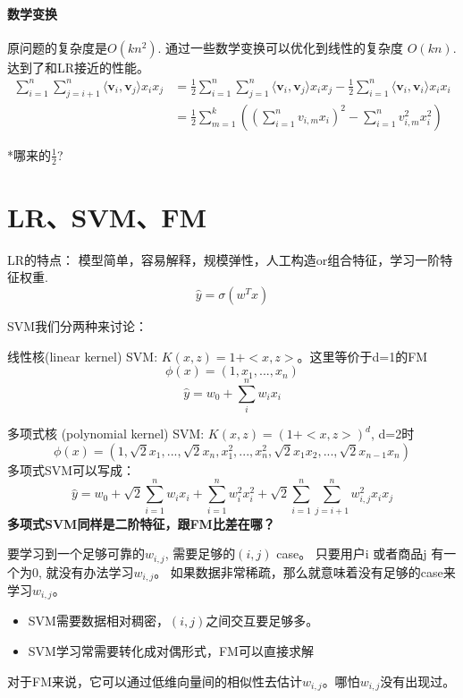 \documentclass{article}
\begin{document}
\begin{CJK*}{UTF8}{gbsn}
\paragraph{数学变换} 原问题的复杂度是$O(kn^{2})$. 通过一些数学变换可以优化到线性的复杂度 $O(kn)$. 达到了和LR接近的性能。
\begin{align*}
\sum_{i=1}^{n}\sum_{j=i+1}^{n}\langle \textbf{v}_{i} ,\textbf{v}_{j} \rangle x_{i}x_{j}
&= \frac{1}{2} \sum_{i=1}^{n}\sum_{j=1}^{n}\langle \textbf{v}_{i} ,\textbf{v}_{j} \rangle x_{i}x_{j} -\frac{1}{2}\sum_{i=1}^{n}\langle \textbf{v}_{i} ,\textbf{v}_{i} \rangle x_{i}x_{i} \\
&= \frac{1}{2}\sum_{m=1}^{k}\left( \left(\sum_{i=1}^{n}v_{i,m}x_{i}\right)^{2} -\sum_{i=1}^{n}v_{i,m}^{2}x_{i}^{2} \right)
\end{align*}

*哪来的$\frac{1}{2}$?

\section{LR、SVM、FM}
LR的特点： 模型简单，容易解释，规模弹性，人工构造or组合特征，学习一阶特征权重.
$$\widehat{y}=\sigma(w^{T}x)$$

SVM我们分两种来讨论：

线性核(linear kernel) SVM: $K(x,z)=1+<x,z>$。这里等价于d=1的FM
$$\phi(x)=(1,x_{1},...,x_{n})$$
$$\widehat{y}=w_{0}+\sum_{i}^{n}w_{i}x_{i}$$

多项式核 (polynomial kernel) SVM: $K(x,z)=(1+<x,z>)^{d}$, d=2时
$$\phi(x)=(1,\sqrt{2}x_{1},...,\sqrt{2}x_{n},x_{1}^2,...,x_{n}^2,\sqrt{2}x_{1}x_{2},...,\sqrt{2}x_{n-1}x_{n})$$
多项式SVM可以写成：
$$\widehat{y}= w_{0}+\sqrt{2}\sum_{i=1}^{n}w_{i}x_{i}+\sum_{i=1}^{n}w_{i}^{2}x_{i}^{2}+\sqrt{2} \sum_{i=1}^{n}\sum_{j=i+1}^{n} w_{i,j}^{2} x_{i}x_{j}$$
\noindent
\textbf{多项式SVM同样是二阶特征，跟FM比差在哪？}

要学习到一个足够可靠的$w_{i,j}$, 需要足够的$(i,j)$ case。 只要用户i 或者商品j 有一个为0, 就没有办法学习$w_{i,j}$。 如果数据非常稀疏，那么就意味着没有足够的case来学习$w_{i,j}$。

\begin{itemize}
\item SVM需要数据相对稠密，$(i,j)$之间交互要足够多。
\item SVM学习常需要转化成对偶形式，FM可以直接求解
\end{itemize}

对于FM来说，它可以通过低维向量间的相似性去估计$w_{i,j}$。哪怕$w_{i,j}$没有出现过。


\end{CJK*}
\end{document}
